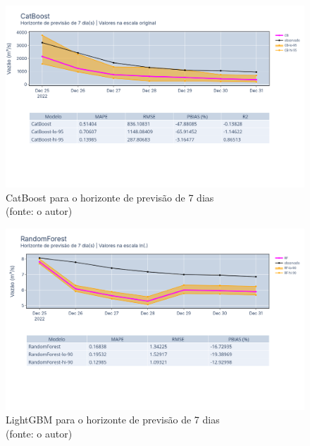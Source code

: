 \begin{figure}[!h]
	\centering
	\includegraphics[scale=0.33]{Figuras/jequiti/resultados/CatBoost_fh7.png}
	\caption{CatBoost para o horizonte de previsão de 7 dias\\(fonte: o autor)}
	\label{fig:jequiti_CatBoostRegressor_fh7}
\end{figure}

\begin{figure}[!h]
	\centering
	\includegraphics[scale=0.33]{Figuras/jequiti/resultados/RandomForest_fh7.png}
	\caption{LightGBM para o horizonte de previsão de 7 dias\\(fonte: o autor)}
	\label{fig:jequiti_LGBMRegressor_fh7}
\end{figure}

